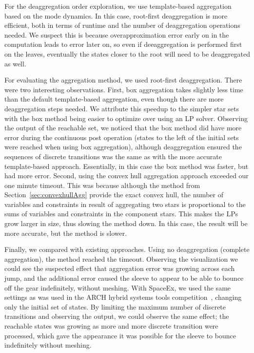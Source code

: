 For the deaggregation order exploration, we use template-based aggregation based on the mode dynamics.
%
In this case, root-first deaggregation is more efficient, both in terms of runtime and the number of deaggregation operations needed.
%
We suspect this is because overapproximation error early on in the computation leads to error later on, so even if deeaggregation is performed first on the leaves,
eventually the states closer to the root will need to be deaggregated as well.

For evaluating the aggregation method, we used root-first deaggregation.
%
There were two interesting observations.
%
First, box aggregation takes slightly less time than the default template-based aggregation, even though there are more deaggregation steps needed.
%
We attribute this speedup to the simpler star sets with the box method being easier to optimize over using an LP solver.
%
Observing the output of the reachable set, we noticed that the box method did have more error during the continuous post operation
(states to the left of the initial sets were reached when using box aggregation),
although deaggregation ensured the sequences of discrete transitions
was the same as with the more accurate template-based approach.
%
Essentially, in this case the box method was faster, but had more error.
%
Second, using the convex hull aggregation approach exceeded our one minute timeout.
%
This was because although the method from Section~\ref{sec:convexhullAgg} provide the exact convex hull, the number of variables and constraints
in result of aggregating two stars is proportional to the sums of variables and constraints in the component stars.
%
This makes the LPs grow larger in size, thus slowing the method down.
%
In this case, the result will be more accurate, but the method is slower.

Finally, we compared with existing approaches.
%
Using no deaggregation (complete aggregation), the method reached the timeout.
%
Observing the visualization we could see the suspected effect that aggregation error was growing across each jump, and
the additional error caused the sleeve to appear to be able to bounce off the gear indefinitely, without meshing.
%
With SpaceEx, we used the same settings as was used in the ARCH hybrid systems tools competition~\cite{archcomp19},
changing only the initial set of states.
%
By limiting the maximum number of discrete transitions and observing the output,
we could observe the same effect; the reachable states was growing as more and more discrete transition were processed, which
gave the appearance it was possible for the sleeve to bounce indefinitely without meshing.

%

